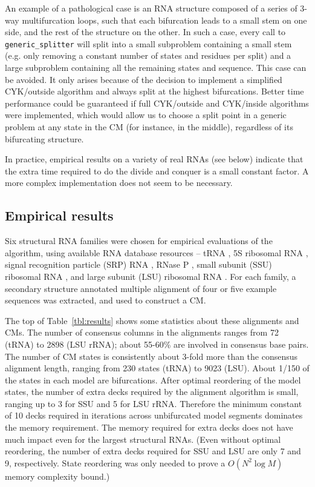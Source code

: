 \documentclass[11pt]{article}
\begin{document}
An example of a pathological case is an RNA structure composed of a
series of 3-way multifurcation loops, such that each bifurcation leads
to a small stem on one side, and the rest of the structure on the
other. In such a case, every call to \texttt{generic\_splitter} will
split into a small subproblem containing a small stem (e.g. only
removing a constant number of states and residues per split) and a
large subproblem containing all the remaining states and
sequence. This case can be avoided. It only arises because of the
decision to implement a simplified CYK/outside algorithm and always
split at the highest bifurcations. Better time performance could be
guaranteed if full CYK/outside and CYK/inside algorithms were
implemented, which would allow us to choose a split point in a generic
problem at any state in the CM (for instance, in the middle),
regardless of its bifurcating structure.

In practice, empirical results on a variety of real RNAs (see below)
indicate that the extra time required to do the divide and conquer is
a small constant factor. A more complex implementation does not seem
to be necessary.

\subsection{Empirical results}

Six structural RNA families were chosen for empirical evaluations of
the algorithm, using available RNA database resources -- tRNA
\cite{Steinberg93}, 5S ribosomal RNA \cite{Szymanski02}, signal
recognition particle (SRP) RNA \cite{Larsen91}, RNase P
\cite{Brown99}, small subunit (SSU) ribosomal RNA \cite{Neefs93}, and
large subunit (LSU) ribosomal RNA \cite{deRijk94}. For each family, a
secondary structure annotated multiple alignment of four or five
example sequences was extracted, and used to construct a CM. 

The top of Table~\ref{tbl:results} shows some statistics about these
alignments and CMs. The number of consensus columns in the alignments
ranges from 72 (tRNA) to 2898 (LSU rRNA); about 55-60\% are involved
in consensus base pairs. The number of CM states is consistently about
3-fold more than the consensus alignment length, ranging from 230
states (tRNA) to 9023 (LSU). About 1/150 of the states in each model
are bifurcations. After optimal reordering of the model states, the
number of extra decks required by the alignment algorithm is small,
ranging up to 3 for SSU and 5 for LSU rRNA. Therefore the minimum
constant of 10 decks required in iterations across unbifurcated model
segments dominates the memory requirement. The memory required for
extra decks does not have much impact even for the largest structural
RNAs. (Even without optimal reordering, the number of extra decks
required for SSU and LSU are only 7 and 9, respectively. State
reordering was only needed to prove a $O(N^2\log M)$ memory complexity
bound.)
\end{document}
